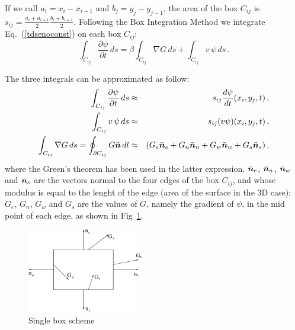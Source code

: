\documentclass[a4paper,11pt]{article}
\newcommand{\ve}[1]{\mbox{\boldmath $ #1$}}
\begin{document}
If we call $a_i = x_i - x_{i-1}$ and
$b_j = y_j - y_{j-1}$, the area of the box $C_{ij}$ is
$s_{ij} = \frac{a_i+a_{i+1}}{2} \frac{b_i+b_{i+1}}{2}$.
Following the Box Integration Method we integrate Eq.~(\ref{tdsenoconst}) on each box $C_{ij}$:
\begin{equation}
\int_{C_{ij}} \frac{\partial \psi}{\partial t} \, ds = 
   \beta \int_{C_{ij}} \nabla G \, ds + 
   \int_{C_{ij}} v \, \psi \, ds \, .
\end{equation}

The three integrals can be approximated as follow:
\begin{eqnarray}
\int_{C_{ij}} \frac{\partial \psi}{\partial t} \, ds & \approx &
   s_{ij} \frac{d \psi}{dt}(x_i, y_j, t) \, , \\
\int_{C_{ij}} v \, \psi \, ds & \approx & s_{ij} (v \psi)(x_i, y_j, t) \, , \\
\int_{C_{ij}} \nabla G \, ds = \oint_{\partial C_{ij}} G \bar{\ve{n}} \, dl & \approx &
   (G_e \bar{\ve n}_e + G_n \bar{\ve n}_n + G_w \bar{\ve n}_w + G_s \bar{\ve n}_s) \, ,
   \label{green_int}
\end{eqnarray}
where the Green's theorem has been used in the latter expression.
$\bar{\ve n}_e$, $\bar{\ve n}_n$, $\bar{\ve n}_w$ and $\bar{\ve n}_s$ are the vectors normal to the four
edges of the box ${C_{ij}}$, and whose modulus is equal to the lenght of the edge (area of the surface in the 3D case);
$G_e$, $G_n$, $G_w$ and $G_s$ are the values of $G$, namely the gradient of $\psi$, in the mid point of each edge, as shown in Fig~\ref{fig:single_box}.

\begin{figure}
\centerline{\includegraphics[width=2in] {box.eps} }
\caption{Single box scheme}
\label{fig:single_box}
\end{figure}
\end{document}
